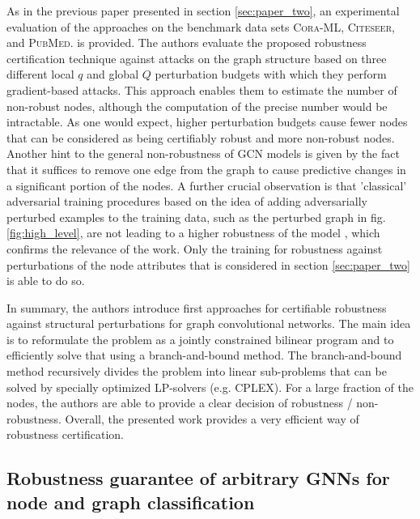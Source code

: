 \documentclass[a4paper,preprint]{sig-alternate}
\begin{document}
As in the previous paper presented in section \ref{sec:paper_two}, an experimental evaluation of the approaches on the benchmark data sets 
\textsc{Cora-ML}, \textsc{Citeseer}, and \textsc{PubMed}. is provided.
The authors evaluate the proposed robustness certification technique against attacks on the graph structure
based on three different local $q$ and global $Q$ perturbation budgets with which they perform gradient-based attacks.
This approach enables them to estimate the number of non-robust nodes, although the computation of the precise number would be intractable. \cite{10.1145/3394486.3403217}
As one would expect, higher perturbation budgets cause fewer nodes that can be considered as being certifiably robust and 
more non-robust nodes. \cite{10.1145/3394486.3403217}
Another hint to the general non-robustness of GCN models is given by the fact that it suffices to remove one edge from the graph
to cause predictive changes in a significant portion of the nodes. \cite{10.1145/3394486.3403217}
A further crucial observation is that 'classical' adversarial training procedures based on the idea of adding adversarially
perturbed examples to the training data, such as the perturbed graph in fig. \ref{fig:high_level}, are not leading to a higher robustness
of the model \cite{10.1145/3394486.3403217}, which confirms the relevance of the work.
Only the training for robustness against perturbations of the node attributes that is considered in section \ref{sec:paper_two} is able to do so.\newline

In summary, the authors introduce first approaches for certifiable robustness against structural perturbations for graph convolutional networks.
The main idea is to reformulate the problem as a jointly constrained bilinear program and to efficiently solve that using a branch-and-bound
method. The branch-and-bound method recursively divides the problem into linear sub-problems that can be solved by specially optimized LP-solvers (e.g. CPLEX).
For a large fraction of the nodes, the authors are able to provide a clear decision of robustness / non-robustness.
Overall, the presented work provides a very efficient way of robustness certification.

\subsection{Robustness guarantee of arbitrary GNNs for node and graph classification}
\label{sec:paper_four}
\end{document}
